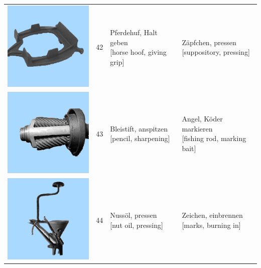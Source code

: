 \documentclass[
  english,
  doc,12pt,twoside,floatsintext]{apa7}
\begin{document}
\begin{center}
\begin{ThreePartTable}
{\begin{longtable}{llll}
\includegraphics[valign=c, scale=0.23]{../materials/unfamiliar/42.png} & 42 & \makecell[l]{Pferdehuf, Halt geben\\{[horse hoof, giving grip]}} & \makecell[l]{Zäpfchen, pressen\\{[suppository, pressing]}}\\
\includegraphics[valign=c, scale=0.23]{../materials/unfamiliar/43.png} & 43 & \makecell[l]{Bleistift, anspitzen\\{[pencil, sharpening]}} & \makecell[l]{Angel, Köder markieren\\{[fishing rod, marking bait]}}\\
\includegraphics[valign=c, scale=0.23]{../materials/unfamiliar/44.png} & 44 & \makecell[l]{Nussöl, pressen\\{[nut oil, pressing]}} & \makecell[l]{Zeichen, einbrennen\\{[marks, burning in]}}\\

\end{longtable}}
\end{ThreePartTable}
\end{center}
\end{document}
